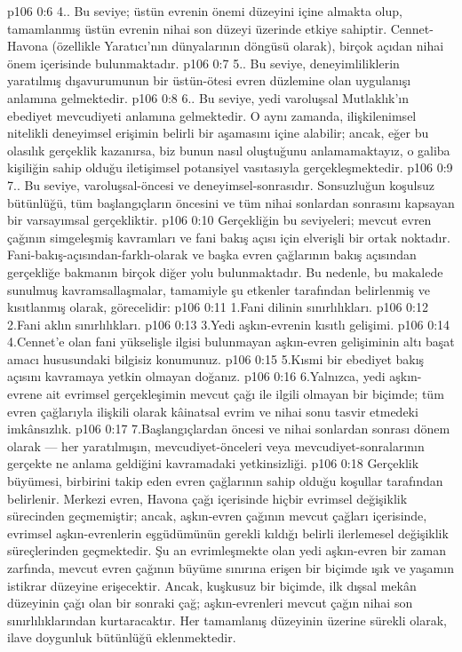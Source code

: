 \vs p106 0:6 4.\bibnobreakspace {}. Bu seviye; üstün evrenin önemi düzeyini içine almakta olup, tamamlanmış üstün evrenin nihai son düzeyi üzerinde etkiye sahiptir. Cennet\hyp{}Havona (özellikle Yaratıcı’nın dünyalarının döngüsü olarak), birçok açıdan nihai önem içerisinde bulunmaktadır.
\vs p106 0:7 5.\bibnobreakspace {}. Bu seviye, deneyimliliklerin yaratılmış dışavurumunun bir üstün\hyp{}ötesi evren düzlemine olan uygulanışı anlamına gelmektedir.
\vs p106 0:8 6.\bibnobreakspace {}. Bu seviye, yedi varoluşsal Mutlaklık’ın ebediyet mevcudiyeti anlamına gelmektedir. O aynı zamanda, ilişkilenimsel nitelikli deneyimsel erişimin belirli bir aşamasını içine alabilir; ancak, eğer bu olasılık gerçeklik kazanırsa, biz bunun nasıl oluştuğunu anlamamaktayız, o galiba kişiliğin sahip olduğu iletişimsel potansiyel vasıtasıyla gerçekleşmektedir.
\vs p106 0:9 7.\bibnobreakspace {}. Bu seviye, varoluşsal\hyp{}öncesi ve deneyimsel\hyp{}sonrasıdır. Sonsuzluğun koşulsuz bütünlüğü, tüm başlangıçların öncesini ve tüm nihai sonlardan sonrasını kapsayan bir varsayımsal gerçekliktir.
\vs p106 0:10 Gerçekliğin bu seviyeleri; mevcut evren çağının simgeleşmiş kavramları ve fani bakış açısı için elverişli bir ortak noktadır. Fani\hyp{}bakış\hyp{}açısından\hyp{}farklı\hyp{}olarak ve başka evren çağlarının bakış açısından gerçekliğe bakmanın birçok diğer yolu bulunmaktadır. Bu nedenle, bu makalede sunulmuş kavramsallaşmalar, tamamiyle şu etkenler tarafından belirlenmiş ve kısıtlanmış olarak, görecelidir:
\vs p106 0:11 1.\bibnobreakspace Fani dilinin sınırlılıkları.
\vs p106 0:12 2.\bibnobreakspace Fani aklın sınırlılıkları.
\vs p106 0:13 3.\bibnobreakspace Yedi aşkın\hyp{}evrenin kısıtlı gelişimi.
\vs p106 0:14 4.\bibnobreakspace Cennet’e olan fani yükselişle ilgisi bulunmayan aşkın\hyp{}evren gelişiminin altı başat amacı hususundaki bilgisiz konumunuz.
\vs p106 0:15 5.\bibnobreakspace Kısmi bir ebediyet bakış açısını kavramaya yetkin olmayan doğanız.
\vs p106 0:16 6.\bibnobreakspace Yalnızca, yedi aşkın\hyp{}evrene ait evrimsel gerçekleşimin mevcut çağı ile ilgili olmayan bir biçimde; tüm evren çağlarıyla ilişkili olarak kâinatsal evrim ve nihai sonu tasvir etmedeki imkânsızlık.
\vs p106 0:17 7.\bibnobreakspace Başlangıçlardan öncesi ve nihai sonlardan sonrası dönem olarak --- her yaratılmışın, mevcudiyet\hyp{}önceleri veya mevcudiyet\hyp{}sonralarının gerçekte ne anlama geldiğini kavramadaki yetkinsizliği.
\vs p106 0:18 Gerçeklik büyümesi, birbirini takip eden evren çağlarının sahip olduğu koşullar tarafından belirlenir. Merkezi evren, Havona çağı içerisinde hiçbir evrimsel değişiklik sürecinden geçmemiştir; ancak, aşkın\hyp{}evren çağının mevcut çağları içerisinde, evrimsel aşkın\hyp{}evrenlerin eşgüdümünün gerekli kıldığı belirli ilerlemesel değişiklik süreçlerinden geçmektedir. Şu an evrimleşmekte olan yedi aşkın\hyp{}evren bir zaman zarfında, mevcut evren çağının büyüme sınırına erişen bir biçimde ışık ve yaşamın istikrar düzeyine erişecektir. Ancak, kuşkusuz bir biçimde, ilk dışsal mekân düzeyinin çağı olan bir sonraki çağ; aşkın\hyp{}evrenleri mevcut çağın nihai son sınırlılıklarından kurtaracaktır. Her tamamlanış düzeyinin üzerine sürekli olarak, ilave doygunluk bütünlüğü eklenmektedir.
